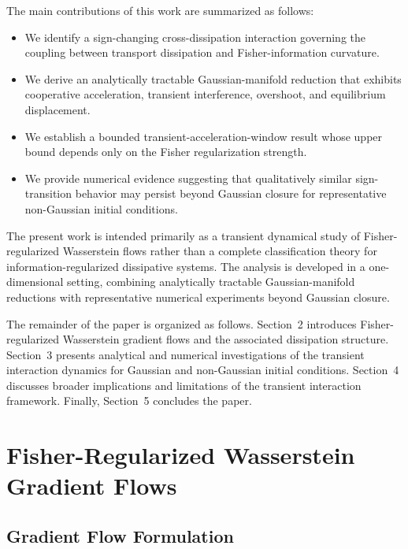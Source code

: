 \documentclass[aps,prl,twocolumn,10pt,superscriptaddress]{revtex4-2}
\begin{document}
The main contributions of this work are summarized as follows:
\begin{itemize}
\item We identify a sign-changing cross-dissipation interaction governing the coupling between transport dissipation and Fisher-information curvature.

\item We derive an analytically tractable Gaussian-manifold reduction that exhibits cooperative acceleration, transient interference, overshoot, and equilibrium displacement.

\item We establish a bounded transient-acceleration-window result whose upper bound depends only on the Fisher regularization strength.

\item We provide numerical evidence suggesting that qualitatively similar sign-transition behavior may persist beyond Gaussian closure for representative non-Gaussian initial conditions.
\end{itemize}

The present work is intended primarily as a transient dynamical study of Fisher-regularized Wasserstein flows rather than a complete classification theory for information-regularized dissipative systems. The analysis is developed in a one-dimensional setting, combining analytically tractable Gaussian-manifold reductions with representative numerical experiments beyond Gaussian closure.

The remainder of the paper is organized as follows. Section~2 introduces Fisher-regularized Wasserstein gradient flows and the associated dissipation structure. Section~3 presents analytical and numerical investigations of the transient interaction dynamics for Gaussian and non-Gaussian initial conditions. Section~4 discusses broader implications and limitations of the transient interaction framework. Finally, Section~5 concludes the paper.

\section{Fisher-Regularized Wasserstein Gradient Flows}
\label{sec:background}

\subsection{Gradient Flow Formulation}
\end{document}
